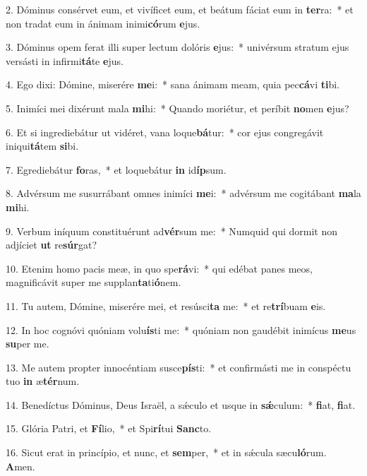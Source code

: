 2. Dóminus consérvet eum, et vivíficet eum, et beátum fáciat eum in \textbf{ter}ra:~*  et non tradat eum in ánimam inimi\textbf{có}rum \textbf{e}jus.\

3. Dóminus opem ferat illi super lectum dolóris \textbf{e}jus:~*  univérsum stratum ejus versásti in infirmi\textbf{tá}te \textbf{e}jus.\

4. Ego dixi: Dómine, miserére \textbf{me}i:~*  sana ánimam meam, quia pec\textbf{cá}vi \textbf{ti}bi.\

5. Inimíci mei dixérunt mala \textbf{mi}hi:~*  Quando moriétur, et períbit \textbf{no}men \textbf{e}jus?\

6. Et si ingrediebátur ut vidéret, vana loque\textbf{bá}tur:~*  cor ejus congregávit iniqui\textbf{tá}tem \textbf{si}bi.\

7. Egrediebátur \textbf{fo}ras,~*  et loquebátur \textbf{in} id\textbf{íp}sum.\

8. Advérsum me susurrábant omnes inimíci \textbf{me}i:~*  advérsum me cogitábant \textbf{ma}la \textbf{mi}hi.\

9. Verbum iníquum constituérunt ad\textbf{vér}sum me:~*  Numquid qui dormit non adjíciet \textbf{ut} re\textbf{súr}gat?\

10. Etenim homo pacis meæ, in quo spe\textbf{rá}vi:~*  qui edébat panes meos, magnificávit super me supplan\textbf{ta}ti\textbf{ó}nem.\

11. Tu autem, Dómine, miserére mei, et resúsci\textbf{ta} me:~*  et re\textbf{trí}buam \textbf{e}is.\

12. In hoc cognóvi quóniam volu\textbf{ís}ti me:~*  quóniam non gaudébit inimícus \textbf{me}us \textbf{su}per me.\

13. Me autem propter innocéntiam susce\textbf{pís}ti:~*  et confirmásti me in conspéctu tuo \textbf{in} æ\textbf{tér}num.\

14. Benedíctus Dóminus, Deus Israël, a sǽculo et usque in \textbf{sǽ}culum:~*  \textbf{fi}at, \textbf{fi}at.\

15. Glória Patri, et \textbf{Fí}lio,~*  et Spi\textbf{rí}tui \textbf{Sanc}to.\

16. Sicut erat in princípio, et nunc, et \textbf{sem}per,~*  et in sǽcula sæcu\textbf{ló}rum. \textbf{A}men.\

